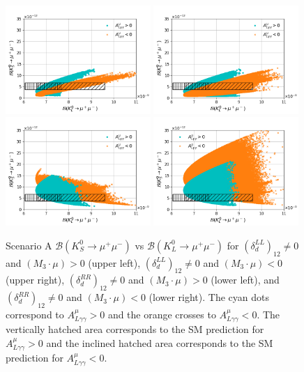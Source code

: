 \begin{figure}[t!]
\centering
\includegraphics[width=0.49\textwidth]{figs/figure_1_SCA_LL_pos.png}
\includegraphics[width=0.49\textwidth]{figs/figure_1_SCA_LL_neg.png}\\
\includegraphics[width=0.49\textwidth]{figs/figure_1_SCA_RR_pos.png}
\includegraphics[width=0.49\textwidth]{figs/figure_1_SCA_RR_neg.png}
\caption{\label{fig:BR_SCA} Scenario A $\mathcal{B}(K_S^0\rightarrow\mu^+\mu^-)$ vs $\mathcal{B}(K_L^0\rightarrow\mu^+\mu^-)$ for $\left(\delta_{d}^{LL}\right)_{12}\neq 0$ and $(M_3\cdot\mu)>0$ (upper left), $\left(\delta_{d}^{LL}\right)_{12}\neq 0$ and $(M_3\cdot\mu)<0$ (upper right), $\left(\delta_{d}^{RR}\right)_{12}\neq 0$ and $(M_3\cdot\mu)>0$ (lower left), and $\left(\delta_{d}^{RR}\right)_{12}\neq 0$ and $(M_3\cdot\mu)<0$ (lower right). The cyan dots correspond to $A^\mu_{L\gamma \gamma} > 0$ and the orange crosses to $A^\mu_{L\gamma \gamma} < 0$. The vertically hatched area corresponds to the SM prediction for $A^\mu_{L\gamma \gamma} > 0$ and the inclined hatched area corresponds to the SM prediction for $A^\mu_{L \gamma \gamma} < 0$.}
\end{figure}


